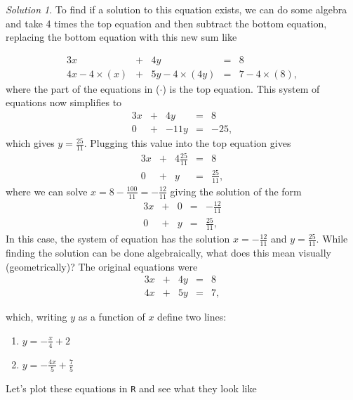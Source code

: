 \documentclass[
]{book}
\providecommand{\tightlist}{%
  \setlength{\itemsep}{0pt}\setlength{\parskip}{0pt}}
\theoremstyle{definition}
\theoremstyle{definition}
\theoremstyle{definition}
\theoremstyle{definition}
\theoremstyle{remark}
\newtheorem*{solution}{Solution}
\begin{document}
\begin{solution}
To find if a solution to this equation exists, we can do some algebra and take 4 times the top equation and then subtract the bottom equation, replacing the bottom equation with this new sum like

\begin{alignat*}{3}
x   & {}+{} & 4 y & {}={} & 8 \\
4 x - 4 \times (x) & {}+{} & 5 y - 4 \times (4y) & {}={} & 7 - 4 \times (8),
\end{alignat*}
where the part of the equations in (\(\cdot\)) is the top equation. This system of equations now simplifies to
\begin{alignat*}{3}
x & {}+{} & 4 y & {}={} & 8 \\
0 & {}+{} & - 11y & {}={} & -25,
\end{alignat*}
which gives \(y = \frac{25}{11}\). Plugging this value into the top equation gives
\begin{alignat*}{3}
x & {}+{} & 4 \frac{25}{11} & {}={} & 8 \\
0 & {}+{} & y & {}={} & \frac{25}{11},
\end{alignat*}
where we can solve \(x = 8 - \frac{100}{11} = -\frac{12}{11}\) giving the solution of the form
\begin{alignat*}{3}
x & {}+{} & 0 & {}={} & -\frac{12}{11} \\
0 & {}+{} & y & {}={} & \frac{25}{11},
\end{alignat*}
In this case, the system of equation has the solution \(x = -\frac{12}{11}\) and \(y = \frac{25}{11}\). While finding the solution can be done algebraically, what does this mean visually (geometrically)? The original equations were
\begin{alignat*}{3}
x   & {}+{} & 4 y & {}={} & 8 \\
4 x & {}+{} & 5 y & {}={} & 7,
\end{alignat*}

which, writing \(y\) as a function of \(x\) define two lines:

\begin{enumerate}
\def\labelenumi{\arabic{enumi})}
\tightlist
\item
  \(y = -\frac{x}{4} + 2\)
\item
  \(y = -\frac{4x}{5} + \frac{7}{5}\)
\end{enumerate}

Let's plot these equations in \texttt{R} and see what they look like


\end{solution}
\end{document}
